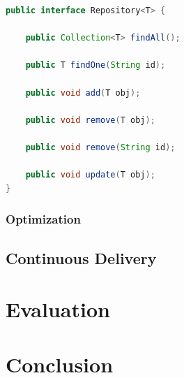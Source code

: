 \documentclass[a4paper,11pt,pdftex,halfparskip,cleardoubleempty,bibtotoc,liststotoc]{scrbook}
\begin{document}
\begin{lstlisting}[language=Java, caption=Repository Interface]
public interface Repository<T> {

    public Collection<T> findAll();

    public T findOne(String id);

    public void add(T obj);

    public void remove(T obj);

    public void remove(String id);

    public void update(T obj);
}
\end{lstlisting}

\subsection{Optimization}


\section{Continuous Delivery}

\chapter{Evaluation}


\chapter{Conclusion}


\nocite{*}



\end{document}

